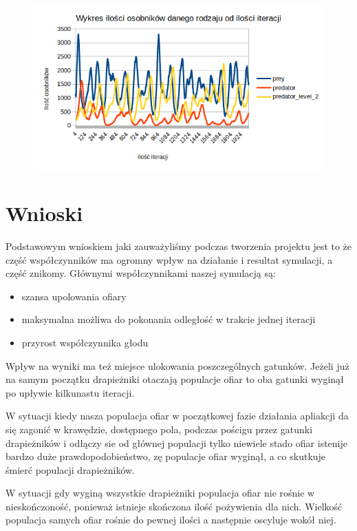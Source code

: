 \begin{figure}[!htb]
	\centering
	\includegraphics[width=1.1\linewidth]{img/ok5}
	\caption{\label{fig:screen} }
\end{figure}

\section{Wnioski}

Podstawowym wnioskiem jaki zauważyliśmy podczas tworzenia projektu jest to że część współczynników ma ogromny wpływ na działanie i resultat symulacji, a część znikomy. Głównymi współczynnikami naszej symulacją są:
\begin{itemize}
	\item szansa upolowania ofiary
	\item maksymalna możliwa do pokonania odległość w trakcie jednej iteracji
	\item przyrost współczynnika głodu 
\end{itemize}
 Wpływ na wyniki ma też miejsce ulokowania poszczególnych gatunków. Jeżeli już na samym początku drapieżniki otaczają populacje ofiar to  oba gatunki wyginął po upływie kilkunastu iteracji.  

W sytuacji kiedy nasza populacja ofiar w początkowej fazie działania apliakcji da się zagonić w krawędzie, dostępnego pola, podczas pościgu przez gatunki drapieżników i odłączy sie od głównej populacji tylko niewiele stado ofiar istenije bardzo duże prawdopodobieństwo, zę populacje ofiar wyginął, a co skutkuje śmierć populacji drapieżników.

W sytuacji gdy wyginą wszystkie drapieżniki populacja ofiar nie rośnie w nieskończoność, ponieważ istnieje skończona ilość pożywienia dla nich. Wielkość populacja samych ofiar rośnie do pewnej ilości a następnie oscyluje wokół niej. 


